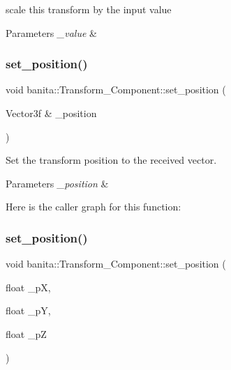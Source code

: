 scale this transform by the input value 


\begin{DoxyParams}{Parameters}
{\em \+\_\+value} & \\
\hline
\end{DoxyParams}
\mbox{\label{classbanita_1_1_transform___component_ae7a4af52065190f0a49a78b8f33da4b1}} 
\subsubsection{\texorpdfstring{set\_position()}{set\_position()}\hspace{0.1cm}{\footnotesize\ttfamily [1/2]}}
{\footnotesize\ttfamily void banita\+::\+Transform\+\_\+\+Component\+::set\+\_\+position (\begin{DoxyParamCaption}\item[{Vector3f \&}]{\+\_\+position }\end{DoxyParamCaption})\hspace{0.3cm}{\ttfamily [inline]}}



Set the transform position to the received vector. 


\begin{DoxyParams}{Parameters}
{\em \+\_\+position} & \\
\hline
\end{DoxyParams}
Here is the caller graph for this function\+:
\mbox{\label{classbanita_1_1_transform___component_a8f3783520cfdd86e531cecb1170af193}} 
\subsubsection{\texorpdfstring{set\_position()}{set\_position()}\hspace{0.1cm}{\footnotesize\ttfamily [2/2]}}
{\footnotesize\ttfamily void banita\+::\+Transform\+\_\+\+Component\+::set\+\_\+position (\begin{DoxyParamCaption}\item[{float}]{\+\_\+pX,  }\item[{float}]{\+\_\+pY,  }\item[{float}]{\+\_\+pZ }\end{DoxyParamCaption})\hspace{0.3cm}{\ttfamily [inline]}}



